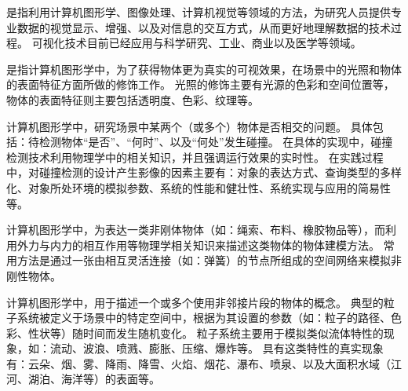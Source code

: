 \begin{definition}[可视化]
是指利用计算机图形学、图像处理、计算机视觉等领域的方法，为研究人员提供专业数据的视觉显示、增强、以及对信息的交互方式，从而更好地理解数据的技术过程。
可视化技术目前已经应用与科学研究、工业、商业以及医学等领域\cite{Hearn2004CGBook}。
\end{definition}

\begin{definition}[渲染]
是指计算机图形学中，为了获得物体更为真实的可视效果，在场景中的光照和物体的表面特征方面所做的修饰工作。
光照的修饰主要有光源的色彩和空间位置等，物体的表面特征则主要包括透明度、色彩、纹理等\cite{Hearn2004CGBook}。
\end{definition}

\begin{definition}[碰撞检测]
计算机图形学中，研究场景中某两个（或多个）物体是否相交的问题。
具体包括：待检测物体“是否”、“何时”、以及“何处”发生碰撞。
在具体的实现中，碰撞检测技术利用物理学中的相关知识，并且强调运行效果的实时性。
在实践过程中，对碰撞检测的设计产生影像的因素主要有：对象的表达方式、查询类型的多样化、对象所处环境的模拟参数、系统的性能和健壮性、系统实现与应用的简易性等\cite{Ericson2005CDBook}。
\end{definition}

\begin{definition}[形变模型]
计算机图形学中，为表达一类非刚体物体（如：绳索、布料、橡胶物品等），而利用外力与内力的相互作用等物理学相关知识来描述这类物体的物体建模方法。
常用方法是通过一张由相互灵活连接（如：弹簧）的节点所组成的空间网络来模拟非刚性物体\cite{Hearn2004CGBook}。
\end{definition}

\begin{definition}[中心线提取]
\end{definition}

\begin{definition}[状态机]
\end{definition}

\begin{definition}[粒子系统]
计算机图形学中，用于描述一个或多个使用非邻接片段的物体的概念。
典型的粒子系统被定义于场景中的特定空间中，根据为其设置的参数（如：粒子的路径、色彩、性状等）随时间而发生随机变化。
粒子系统主要用于模拟类似流体特性的现象，如：流动、波浪、喷溅、膨胀、压缩、爆炸等。
具有这类特性的真实现象有：云朵、烟、雾、降雨、降雪、火焰、烟花、瀑布、喷泉、以及大面积水域（江河、湖泊、海洋等）的表面等\cite{Hearn2004CGBook}。
\end{definition}

